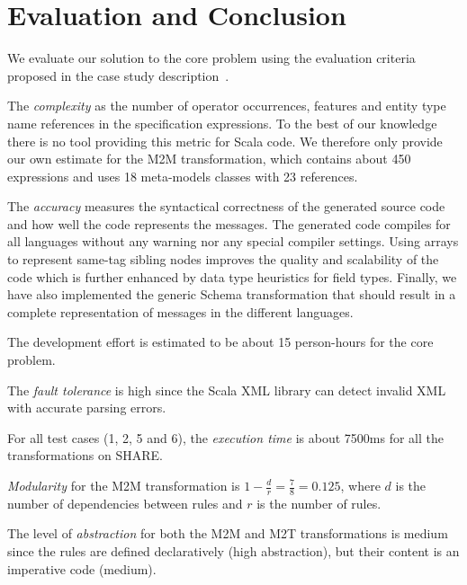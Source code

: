 \vspace*{-3mm}
\section{Evaluation and Conclusion}
\label{sec:EvaluationConclusion}

\enlargethispage{7mm}

We evaluate our solution to the core problem using the evaluation criteria proposed in the case study description~\cite{Lano2014}.

\begin{compactitem}[$-$]
  \item The \emph{complexity} as the number of operator occurrences, features and entity type name references in the specification expressions.
  To the best of our knowledge there is no tool providing this metric for Scala code.
  We therefore only provide our own estimate for the M2M transformation, which contains about 450 expressions and uses 18 meta-models classes with 23 references.

  \item The \emph{accuracy} measures the syntactical correctness of the generated source code and how well the code represents the \FIXML messages.
  The generated code compiles for all languages without any warning nor any special compiler settings.
  Using arrays to represent same-tag sibling nodes improves the quality and scalability of the code which is further enhanced by data type heuristics for field types.
  Finally, we have also implemented the generic \FIXML Schema transformation that should result in a complete representation of \FIXML messages in the different languages.

  \item The development effort is estimated to be about 15 person-hours for the core problem.

  \item The \emph{fault tolerance} is high since the Scala XML library can detect invalid XML with accurate parsing errors.

  \item For all test cases (1, 2, 5 and 6), the \emph{execution time} is about 7500ms for all the transformations on SHARE.

  \item \emph{Modularity} for the M2M transformation is $1 - \frac{d}{r} = \frac{7}{8} = 0.125$, where $d$ is the number of dependencies between rules and $r$ is the number of rules.

  \item The level of \emph{abstraction} for both the M2M and M2T transformations is medium since the rules are defined declaratively (high abstraction), but their content is an imperative code (medium).

\end{compactitem}


